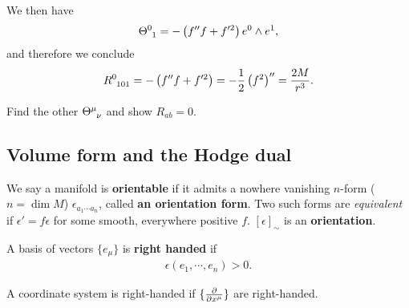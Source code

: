 We then have
\begin{align}
    \tensor{\Theta}{^{0}_1} = - \left( f'' f + f'^2 \right) e^{0} \wedge e^{1}
,\end{align}
and therefore we conclude
\begin{align}
    \tensor{R}{^{0}_{101}} = - \left( f'' f + f'^2 \right) = -\frac{1}{2} \left( f^2 \right)'' = \frac{2M}{r^3}
.\end{align}

\begin{exercise}
    Find the other $\tensor{\Theta}{^{\mu}_{\nu}}$ and show $R_{ab} = 0$.
\end{exercise}

\subsection{Volume form and the Hodge dual}

\begin{definition}
    We say a manifold is \textbf{orientable} if it admits a nowhere vanishing $n$-form ($n = \dim M$) $\epsilon_{a_1 \cdots a_n}$, called \textbf{an orientation form}. Two such forms are \textit{equivalent} if $\epsilon' = f \epsilon$ for some smooth, everywhere positive $f$. $\left[ \epsilon \right]_{\sim }$ is an \textbf{orientation}.
\end{definition}

A basis of vectors $\{e_{\mu}\} $ is \textbf{right handed} if
\begin{align}
    \epsilon \left( e_1, \cdots, e_{n} \right) > 0
.\end{align}

A coordinate system is right-handed if $\{\pdv{x^{\mu}}\} $ are right-handed.


